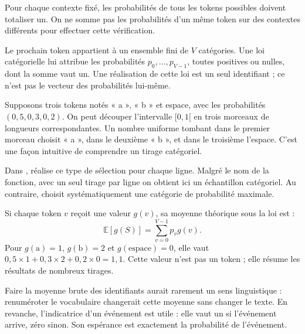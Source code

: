 Pour chaque contexte fixé, les probabilités de tous les tokens
possibles doivent totaliser un. On ne somme pas les probabilités
d'un même token sur des contextes différents pour effectuer
cette vérification.



Le prochain token appartient à un ensemble fini de \(V\) catégories.
Une loi catégorielle lui attribue les probabilités
\(p_0,\ldots,p_{V-1}\), toutes positives ou nulles, dont la somme
vaut un. Une réalisation de cette loi est un seul identifiant ;
ce n'est pas le vecteur des probabilités lui-même.

Supposons trois tokens notés « a », « b » et espace, avec les
probabilités \((0{,}5,0{,}3,0{,}2)\). On peut découper
l'intervalle \([0,1[\) en trois morceaux de longueurs correspondantes.
Un nombre uniforme tombant dans le premier morceau choisit « a »,
dans le deuxième « b », et dans le troisième l'espace.
C'est une façon intuitive de comprendre un tirage catégoriel.

Dans , 
réalise ce type de sélection pour chaque ligne. Malgré le nom
de la fonction, avec un seul tirage par ligne on obtient ici
un échantillon catégoriel. Au contraire, 
choisit systématiquement une catégorie de probabilité maximale.

Si chaque token \(v\) reçoit une valeur \(g(v)\), sa moyenne
théorique sous la loi est :
\[
 \mathbb{E}[g(S)]=\sum_{v=0}^{V-1}p_vg(v).
\]
Pour \(g(\text{a})=1\), \(g(\text{b})=2\) et
\(g(\text{espace})=0\), elle vaut
\(0{,}5\times1+0{,}3\times2+0{,}2\times0=1{,}1\).
Cette valeur n'est pas un token ; elle résume les résultats
de nombreux tirages.

Faire la moyenne brute des identifiants aurait rarement un sens
linguistique : renuméroter le vocabulaire changerait cette moyenne
sans changer le texte. En revanche, l'indicatrice d'un événement
est utile : elle vaut un si l'événement arrive, zéro sinon.
Son espérance est exactement la probabilité de l'événement.

